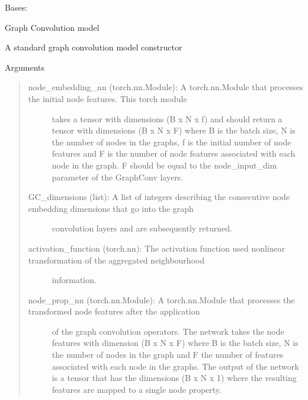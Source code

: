 \documentclass[letterpaper,10pt,english]{sphinxmanual}
\begin{document}

\begin{fulllineitems}
\label{\detokenize{modules/gqcml.nn:gqcml.nn.models.GraphConv_model}}
Bases: 

Graph Convolution model

A standard graph convolution model constructor

Arguments
\begin{quote}
\begin{description}
\item[{node\_embedding\_nn (torch.nn.Module): A torch.nn.Module that processes the initial node features. This torch module}] \leavevmode
takes a tensor with dimensions (B x N x f)  and should return a tensor with
dimensions (B x N x F) where B is the batch size, N is the number of nodes in
the graphs, f is the initial number of node features and F is the number of node features
associated with each node in the graph. F should be equal to the node\_input\_dim
parameter of the GraphConv layers.

\item[{GC\_dimensions (list): A list of integers describing the consecutive node embedding dimensions that go into the graph}] \leavevmode
convolution layers and are subsequently returned.

\item[{activation\_function (torch.nn): The activation function used non\sphinxhyphen{}linear transformation of the aggregated neighbourhood}] \leavevmode
information.

\item[{node\_prop\_nn (torch.nn.Module): A torch.nn.Module that processes the transformed node features after the application}] \leavevmode
of the graph convolution operators. The network takes the node features with dimension
(B x N x F) where B is the batch size, N is the number of nodes in the graph and F
the number of features associated with each node in the graphs. The output of the network
is a tensor that has the dimensions (B x N x 1) where the resulting features are
mapped to a single node property.


\end{description}
\end{quote}
\end{fulllineitems}
\end{document}
